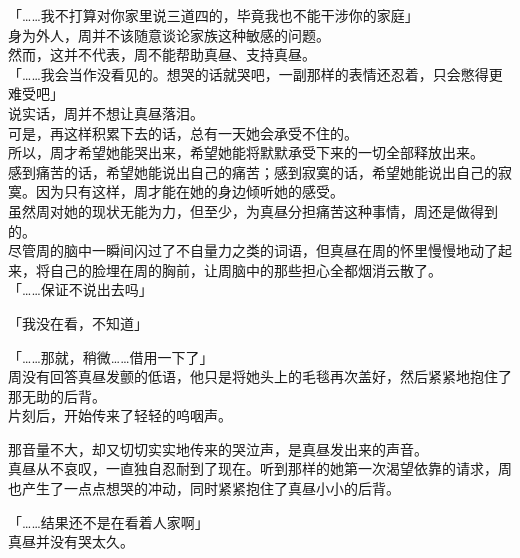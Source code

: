「……我不打算对你家里说三道四的，毕竟我也不能干涉你的家庭」\\

身为外人，周并不该随意谈论家族这种敏感的问题。\\

然而，这并不代表，周不能帮助真昼、支持真昼。\\

「……我会当作没看见的。想哭的话就哭吧，一副那样的表情还忍着，只会憋得更难受吧」\\

说实话，周并不想让真昼落泪。\\

可是，再这样积累下去的话，总有一天她会承受不住的。\\

所以，周才希望她能哭出来，希望她能将默默承受下来的一切全部释放出来。\\

感到痛苦的话，希望她能说出自己的痛苦；感到寂寞的话，希望她能说出自己的寂寞。因为只有这样，周才能在她的身边倾听她的感受。\\

虽然周对她的现状无能为力，但至少，为真昼分担痛苦这种事情，周还是做得到的。\\

尽管周的脑中一瞬间闪过了不自量力之类的词语，但真昼在周的怀里慢慢地动了起来，将自己的脸埋在周的胸前，让周脑中的那些担心全都烟消云散了。\\

「……保证不说出去吗」

「我没在看，不知道」

「……那就，稍微……借用一下了」\\

周没有回答真昼发颤的低语，他只是将她头上的毛毯再次盖好，然后紧紧地抱住了那无助的后背。\\

片刻后，开始传来了轻轻的呜咽声。

那音量不大，却又切切实实地传来的哭泣声，是真昼发出来的声音。\\

真昼从不哀叹，一直独自忍耐到了现在。听到那样的她第一次渴望依靠的请求，周也产生了一点点想哭的冲动，同时紧紧抱住了真昼小小的后背。\\

\vspace{2\baselineskip}

「……结果还不是在看着人家啊」\\

真昼并没有哭太久。

